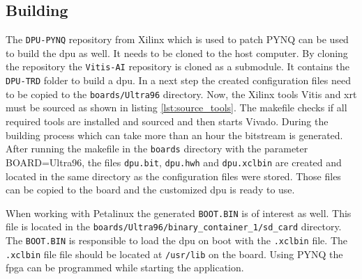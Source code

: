 \subsection{Building}
\label{subsec:embedded_platform:dpu:building}

The \texttt{DPU-PYNQ} repository from Xilinx which is used to patch PYNQ can be used to build the \acrshort{dpu} as well.
It needs to be cloned to the host computer.
By cloning the repository the \texttt{Vitis-AI} repository is cloned as a submodule.
It contains the \texttt{DPU-TRD} folder to build a \acrshort{dpu}.
In a next step the created configuration files need to be copied to the \texttt{boards/Ultra96} directory.
Now, the Xilinx tools Vitis and \acrshort{xrt} must be sourced as shown in listing \ref{lst:source_tools}.
The makefile checks if all required tools are installed and sourced and then starts Vivado.
During the building process which can take more than an hour the bitstream is generated. 
After running the makefile in the \texttt{boards} directory with the parameter BOARD=Ultra96, the files \texttt{dpu.bit}, \texttt{dpu.hwh} and \texttt{dpu.xclbin} are created and located in the same directory as the configuration files were stored.
Those files can be copied to the board and the customized \acrshort{dpu} is ready to use.

When working with Petalinux the generated \texttt{BOOT.BIN} is of interest as well.
This file is located in the \texttt{boards/Ultra96/binary\_container\_1/sd\_card} directory.
The \texttt{BOOT.BIN} is responsible to load the \acrshort{dpu} on boot with the \texttt{.xclbin} file.
The \texttt{.xclbin} file file should be located at \texttt{/usr/lib} on the board.
Using PYNQ the \acrshort{fpga} can be programmed while starting the application.
